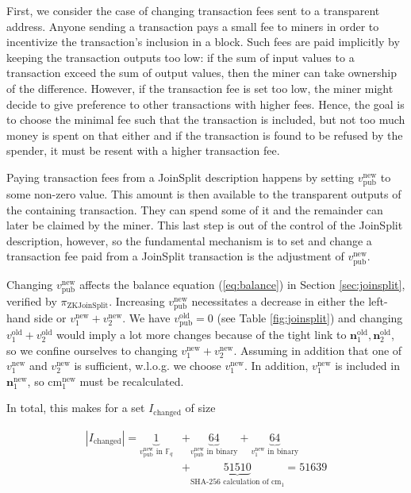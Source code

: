 \documentclass{article}
\begin{document}
First, we consider the case of changing transaction fees sent to a transparent address.
Anyone sending a transaction pays a small fee to miners in order to incentivize the transaction's inclusion in a block.
Such fees are paid implicitly by keeping the transaction outputs too low: if the sum of input values to a transaction exceed the sum of output values, then the miner can take ownership of the difference.
However, if the transaction fee is set too low, the miner might decide to give preference to other transactions with higher fees.
Hence, the goal is to choose the minimal fee such that the transaction is included, but not too much money is spent on that either and if the transaction is found to be refused by the spender, it must be resent with a higher transaction fee.

Paying transaction fees from a JoinSplit description happens by setting $v_\text{pub}^\text{new}$ to some non-zero value.
This amount is then available to the transparent outputs of the containing transaction.
They can spend some of it and the remainder can later be claimed by the miner.
This last step is out of the control of the JoinSplit description, however, so the fundamental mechanism is to set and change a transaction fee paid from a JoinSplit transaction is the adjustment of $v_\text{pub}^\text{new}$.

Changing $v_\text{pub}^\text{new}$ affects the balance equation (\ref{eq:balance}) in Section \ref{sec:joinsplit}, verified by $\pi_\text{ZKJoinSplit}$.
Increasing $v_\text{pub}^\text{new}$ necessitates a decrease in either the left-hand side or $v_1^\text{new} + v_2^\text{new}$.
We have $v_\text{pub}^\text{old} = 0$ (see Table \ref{fig:joinsplit}) and changing $v_1^\text{old} + v_2^\text{old}$ would imply a lot more changes because of the tight link to $\boldsymbol{n}^\text{old}_1,\boldsymbol{n}^\text{old}_2$, so we confine ourselves to changing $v_1^\text{new} + v_2^\text{new}$.
Assuming in addition that one of $v_1^\text{new}$ and $v_2^\text{new}$ is sufficient, w.l.o.g. we choose $v_1^\text{new}$.
In addition, $v_1^\text{new}$ is included in $\boldsymbol{n}^\text{new}_1$, so $\text{cm}_1^\text{new}$ must be recalculated.

In total, this makes for a set $I_\text{changed}$ of size

\begin{align*}
        |I_\text{changed}| = \underbrace{1}_\text{$v_\text{pub}^\text{new}$ in $\mathbb{F}_q$} &+ \underbrace{64}_\text{$v_\text{pub}^\text{new}$ in binary} + \underbrace{64}_\text{$v_1^\text{new}$ in binary} \\
        &+ \underbrace{51510}_\text{SHA-256 calculation of $\text{cm}_1$} = 51639
\end{align*}
\end{document}
